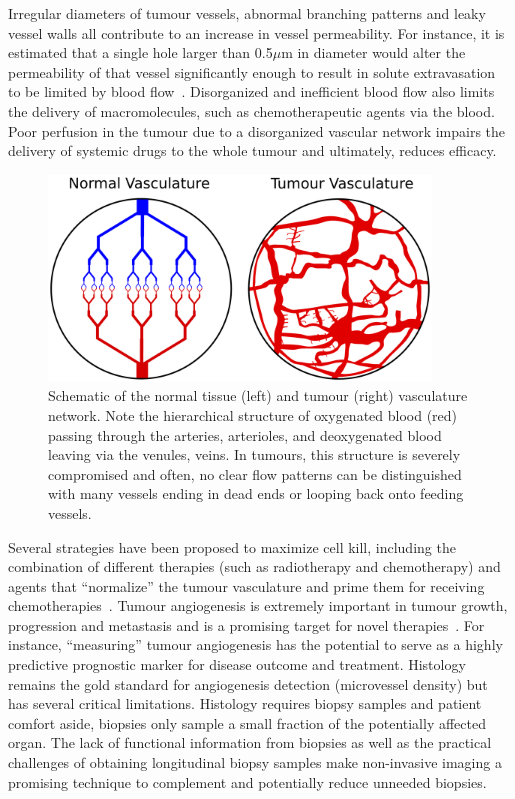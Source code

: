 Irregular diameters of tumour vessels, abnormal branching patterns and leaky vessel walls all contribute to an increase in vessel permeability.
For instance, it is estimated that a single hole larger than 0.5$\mu$m in diameter would alter the permeability of that vessel significantly enough to result in solute extravasation to be limited by blood flow~\cite{McDonald:2002ut}.
Disorganized and inefficient blood flow also limits the delivery of macromolecules, such as chemotherapeutic agents via the blood.
Poor perfusion in the tumour due to a disorganized vascular network impairs the delivery of systemic drugs to the whole tumour and ultimately, reduces efficacy. 

\begin{figure}  
 \begin{center}  
 \includegraphics[width=4in]{intro/intro-images/tumourVasculature.pdf}
 \caption{Schematic of the normal tissue (left) and tumour (right) vasculature network. 
 Note the hierarchical structure of oxygenated blood (red) passing through the arteries, arterioles, and deoxygenated blood leaving via the venules, veins. 
 In tumours, this structure is severely compromised and often, no clear flow patterns can be distinguished with many vessels ending in dead ends or looping back onto feeding vessels.}
 \label{tumourVasculature}
 \end{center}
\end{figure}

Several strategies have been proposed to maximize cell kill, including the combination of different therapies (such as radiotherapy and chemotherapy) and agents that ``normalize'' the tumour vasculature and prime them for receiving chemotherapies~\cite{Jain:2005gk}.
Tumour angiogenesis is extremely important in tumour growth, progression and metastasis and is a promising target for novel therapies~\cite{Miles:2000wq}.
For instance, ``measuring'' tumour angiogenesis has the potential to serve as a highly predictive prognostic marker for disease outcome and treatment.
Histology remains the gold standard for angiogenesis detection (microvessel density) but has several critical limitations.
Histology requires biopsy samples and patient comfort aside, biopsies only sample a small fraction of the potentially affected organ.
The lack of functional information from biopsies as well as the practical challenges of obtaining longitudinal biopsy samples make non-invasive imaging a promising technique to complement and potentially reduce unneeded biopsies.


